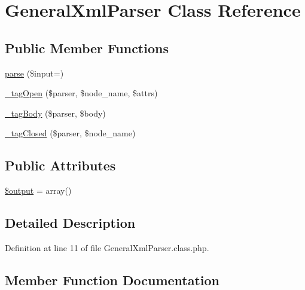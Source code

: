 \hypertarget{classGeneralXmlParser}{}\section{General\+Xml\+Parser Class Reference}
\label{classGeneralXmlParser}
\subsection*{Public Member Functions}
\begin{DoxyCompactItemize}
\item 
\hyperlink{classGeneralXmlParser_a68db7fa48bc66de2c48175422f59927d}{parse} (\$input=\textquotesingle{}\textquotesingle{})
\item 
\hyperlink{classGeneralXmlParser_a2921aab91afa276ce9f6c75cf483e80d}{\+\_\+tag\+Open} (\$parser, \$node\+\_\+name, \$attrs)
\item 
\hyperlink{classGeneralXmlParser_a78c57730ac9d216ba88c02eb2f3c2903}{\+\_\+tag\+Body} (\$parser, \$body)
\item 
\hyperlink{classGeneralXmlParser_a4609e66c695acd3f1a85450228f0b79b}{\+\_\+tag\+Closed} (\$parser, \$node\+\_\+name)
\end{DoxyCompactItemize}
\subsection*{Public Attributes}
\begin{DoxyCompactItemize}
\item 
\hyperlink{classGeneralXmlParser_a33ef1b950659188b06d8586c366f8fe2}{\$output} = array()
\end{DoxyCompactItemize}


\subsection{Detailed Description}


Definition at line 11 of file General\+Xml\+Parser.\+class.\+php.



\subsection{Member Function Documentation}
\hypertarget{classGeneralXmlParser_a78c57730ac9d216ba88c02eb2f3c2903}{}\label{classGeneralXmlParser_a78c57730ac9d216ba88c02eb2f3c2903} 
